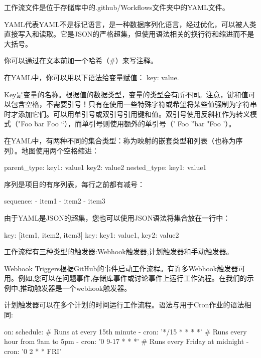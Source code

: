 
工作流文件是位于存储库中的.github/Workflows文件夹中的YAML文件。


YAML代表YAML不是标记语言，是一种数据序列化语言，经过优化，可以被人类直接写入和读取。它是JSON的严格超集，但使用语法相关的换行符和缩进而不是大括号。

你可以通过在文本前加一个哈希（\#）来写注释。

在YAML中，你可以用以下语法给变量赋值： key: value.

Key是变量的名称。根据值的数据类型，变量的类型会有所不同。注意，键和值可以包含空格，不需要引号！只有在使用一些特殊字符或希望将某些值强制为字符串时才添加它们。可以用单引号或双引号引用键和值。双引号使用反斜杠作为转义模式（"Foo \"bar \" Foo “），而单引号则使用额外的单引号（' Foo ”bar "Foo '）。


在YAML中，有两种不同的集合类型：称为映射的嵌套类型和列表（也称为序列）。地图使用两个空格缩进：

\begin{shell}
parent_type:
  key1: value1
  key2: value2
  nested_type:
    key1: value1
\end{shell}

序列是项目的有序列表，每行之前都有减号：

\begin{shell}
sequence:
  - item1
  - item2
  - item3
\end{shell}

由于YAML是JSON的超集，您也可以使用JSON语法将集合放在一行中：

\begin{shell}
key: [item1, item2, item3]
key: {key1: value1, key2: value2}
\end{shell}


工作流程有三种类型的触发器:Webhook触发器,计划触发器和手动触发器。

Webhook Triggers根据GitHub的事件启动工作流程。有许多Webhook触发器可用。例如,您可以在问题事件,存储库事件或讨论事件上运行工作流程。在我们的示例中,推动触发器是一个webhook触发器。

计划触发器可以在多个计划的时间运行工作流程。语法与用于Cron作业的语法相同:

\begin{shell}
on:
  schedule:
    # Runs at every 15th minute
    - cron: '*/15 * * * *'
    # Runs every hour from 9am to 5pm
    - cron: '0 9-17 * * *'
    # Runs every Friday at midnight
    - cron: '0 2 * * FRI'
\end{shell}

